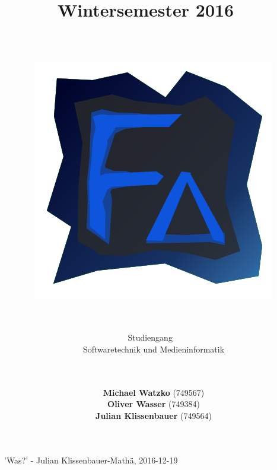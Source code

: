 \documentclass[12pt]{scrartcl}
\title{
	~\\ ~\\
	\labtitle
	~\\ ~\\
		\LARGE \textnormal{
     	\lab
	~\\ Wintersemester 2016 ~\\ ~\\
	}
	\begin{figure}[h!]
		\centering
		\includegraphics[width=.25\textwidth]{../javafx/src/main/resources/images/realIcon.png}
	\end{figure}
}
\subtitle{
\Large \textnormal{
~\\
	Studiengang ~\\
	Softwaretechnik und Medieninformatik \\
~\\
	~\\ \large %
	}
}
\author{
	\large \textbf{Michael Watzko} (749567) \\
	\large \textbf{Oliver Wasser} (749384) \\
	\large \textbf{Julian Klissenbauer} (749564)
}
\date{}
\begin{document}
	\maketitle
	\clearpage
	'Was?' - Julian Klissenbauer-Mathä, 2016-12-19	
	
	\clearpage
	\tableofcontents
	
	\clearpage
	

	\clearpage
		
	
	\clearpage
	
	
	\clearpage
	
	
	\clearpage
	
	
	\clearpage
	
	
	\clearpage
	
	
	\clearpage
	
	
	\clearpage
	\listoffigures
	
	\clearpage
	\printbibliography[heading=bibintoc]
\end{document}
